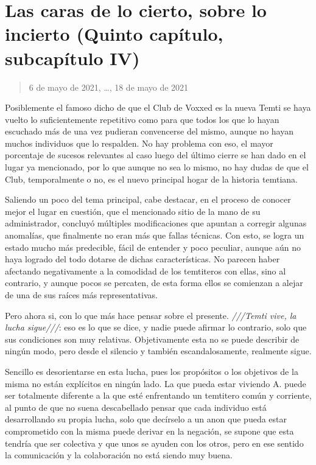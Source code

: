 \documentclass[
  spanish,
]{book}
\begin{document}
\hypertarget{las-caras-de-lo-cierto-sobre-lo-incierto-quinto-capuxedtulo-subcapuxedtulo-iv}{%
\section{Las caras de lo cierto, sobre lo incierto (Quinto capítulo, subcapítulo IV)}\label{las-caras-de-lo-cierto-sobre-lo-incierto-quinto-capuxedtulo-subcapuxedtulo-iv}}

\begin{quote}
6 de mayo de 2021, \ldots, 18 de mayo de 2021
\end{quote}

Posiblemente el famoso dicho de que el Club de Voxxed es la nueva Temti se haya vuelto lo suficientemente repetitivo como para que todos los que lo hayan escuchado más de una vez pudieran convencerse del mismo, aunque no hayan muchos individuos que lo respalden. No hay problema con eso, el mayor porcentaje de sucesos relevantes al caso luego del último cierre se han dado en el lugar ya mencionado, por lo que aunque no sea lo mismo, no hay dudas de que el Club, temporalmente o no, es el nuevo principal hogar de la historia temtiana.

Saliendo un poco del tema principal, cabe destacar, en el proceso de conocer mejor el lugar en cuestión, que el mencionado sitio de la mano de su administrador, concluyó múltiples modificaciones que apuntan a corregir algunas anomalías, que finalmente no eran más que fallas técnicas. Con esto, se logra un estado mucho más predecible, fácil de entender y poco peculiar, aunque aún no haya logrado del todo dotarse de dichas características. No parecen haber afectando negativamente a la comodidad de los temtiteros con ellas, sino al contrario, y aunque pocos se percaten, de esta forma ellos se comienzan a alejar de una de sus raíces más representativas.

Pero ahora si, con lo que más hace pensar sobre el presente. \emph{///Temti vive, la lucha sigue///}: eso es lo que se dice, y nadie puede afirmar lo contrario, solo que sus condiciones son muy relativas. Objetivamente esta no se puede describir de ningún modo, pero desde el silencio y también escandalosamente, realmente sigue.

Sencillo es desorientarse en esta lucha, pues los propósitos o los objetivos de la misma no están explícitos en ningún lado. La que pueda estar viviendo A. puede ser totalmente diferente a la que esté enfrentando un temtitero común y corriente, al punto de que no suena descabellado pensar que cada individuo está desarrollando su propia lucha, solo que decírselo a un anon que pueda estar comprometido con la misma puede derivar en la negación, se supone que esta tendría que ser colectiva y que unos se ayuden con los otros, pero en ese sentido la comunicación y la colaboración no está siendo muy buena.
\end{document}
